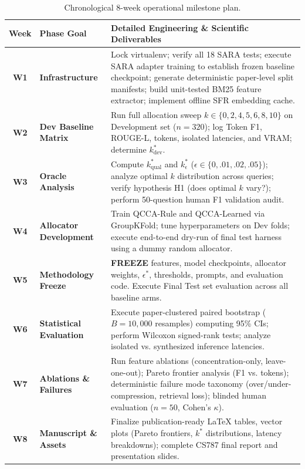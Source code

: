 \documentclass[11pt,a4paper]{article}
\begin{document}
\begin{table}[h]
\centering
\small
\begin{tabularx}{\textwidth}{clp{10.5cm}}
\toprule
\textbf{Week} & \textbf{Phase Goal} & \textbf{Detailed Engineering \& Scientific Deliverables} \\
\midrule
\textbf{W1} & \textbf{Infrastructure} & Lock virtualenv; verify all 18 SARA tests; execute SARA adapter training to establish frozen baseline checkpoint; generate deterministic paper-level split manifests; build unit-tested BM25 feature extractor; implement offline SFR embedding cache. \\
\addlinespace[3pt]
\textbf{W2} & \textbf{Dev Baseline Matrix} & Run full allocation sweep $k \in \{0,2,4,5,6,8,10\}$ on Development set ($n=320$); log Token F1, ROUGE-L, tokens, isolated latencies, and VRAM; determine $k_{\text{dev}}^*$. \\
\addlinespace[3pt]
\textbf{W3} & \textbf{Oracle Analysis} & Compute $k^*_{\text{qual}}$ and $k^*_{\epsilon}$ ($\epsilon \in \{0, .01, .02, .05\}$); analyze optimal $k$ distribution across queries; verify hypothesis H1 (does optimal $k$ vary?); perform 50-question human F1 validation audit. \\
\addlinespace[3pt]
\textbf{W4} & \textbf{Allocator Development} & Train QCCA-Rule and QCCA-Learned via GroupKFold; tune hyperparameters on Dev folds; execute end-to-end dry-run of final test harness using a dummy random allocator. \\
\addlinespace[3pt]
\textbf{W5} & \textbf{Methodology Freeze} & \textbf{FREEZE} features, model checkpoints, allocator weights, $\epsilon^*$, thresholds, prompts, and evaluation code. Execute Final Test set evaluation across all baseline arms. \\
\addlinespace[3pt]
\textbf{W6} & \textbf{Statistical Evaluation} & Execute paper-clustered paired bootstrap ($B=10{,}000$ resamples) computing 95\% CIs; perform Wilcoxon signed-rank tests; analyze isolated vs. synthesized inference latencies. \\
\addlinespace[3pt]
\textbf{W7} & \textbf{Ablations \& Failures} & Run feature ablations (concentration-only, leave-one-out); Pareto frontier analysis (F1 vs. tokens); deterministic failure mode taxonomy (over/under-compression, retrieval loss); blinded human evaluation ($n=50$, Cohen's $\kappa$). \\
\addlinespace[3pt]
\textbf{W8} & \textbf{Manuscript \& Assets} & Finalize publication-ready LaTeX tables, vector plots (Pareto frontiers, $k^*$ distributions, latency breakdowns); complete CS787 final report and presentation slides. \\
\bottomrule
\end{tabularx}
\caption{Chronological 8-week operational milestone plan.}
\end{table}
\end{document}
